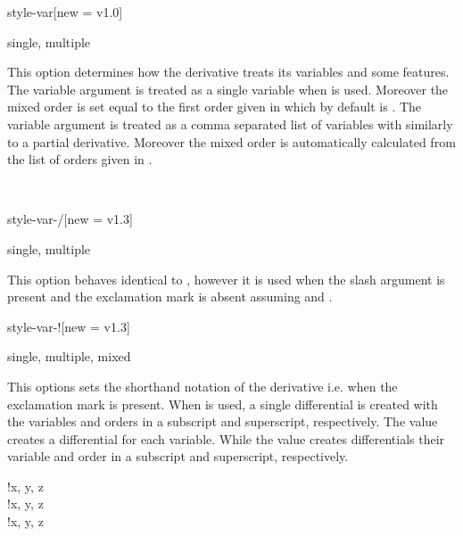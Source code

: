 \clearpage

\begin{option}{style-var}[new = v1.0]
	\begin{values}[default = single]
		single, multiple
	\end{values}
	This option determines how the derivative treats its variables and some features. The variable argument is treated as a single variable when  is used. Moreover the mixed order is set equal to the first order given in  which by default is . The variable argument is treated as a comma separated list of variables with  similarly to a partial derivative. Moreover the mixed order is automatically calculated from the list of orders given in .
	\begin{example}
		 \\
	\end{example}
\end{option}

\begin{option}{style-var-/}[new = v1.3]
	\begin{values}[default = single]
		single, multiple
	\end{values}
	This option behaves identical to , however it is used when the slash argument is present and the exclamation mark is absent assuming  and \keyval{switch-!}{false}.
\end{option}

\begin{option}{style-var-!}[new = v1.3]
	\begin{values}[default = single]
		single, multiple, mixed
	\end{values}
	This options sets the shorthand notation of the derivative i.e. when the exclamation mark is present. When  is used, a single differential is created with the variables and orders in a subscript and superscript, respectively. The value  creates a differential for each variable. While the value  creates differentials their variable and order in a subscript and superscript, respectively.
	\begin{example}
		!{x, y, z} \\
		!{x, y, z} \\
		!{x, y, z}
	\end{example}
\end{option}


